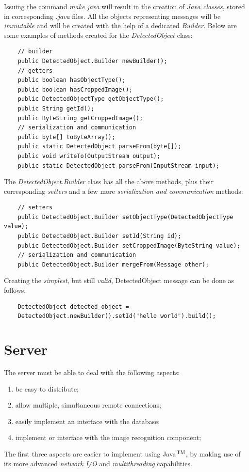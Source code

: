 \documentclass[a4paper,onecolumn,oneside,titlepage,11pt]{report}
\def\tm{\leavevmode\hbox{$\rm {}^{TM}$}}
\begin{document}
Issuing the command \emph{make java} will result in the creation of \emph{Java classes}, stored in corresponding \emph{.java} files.
All the objects representing messages will be \emph{immutable} and will be created with the help of a dedicated \emph{Builder}. Below are some examples of methods created for the \emph{DetectedObject} class:
\begin{lstlisting}
	// builder
	public DetectedObject.Builder newBuilder();
	// getters
	public boolean hasObjectType();
	public boolean hasCroppedImage();
	public DetectedObjectType getObjectType();
	public String getId();
	public ByteString getCroppedImage();
	// serialization and communication
	public byte[] toByteArray();
	public static DetectedObject parseFrom(byte[]);
	public void writeTo(OutputStream output);
	public static DetectedObject parseFrom(InputStream input);
\end{lstlisting}
The \emph{DetectedObject.Builder} class has all the above methods, plus their corresponding \emph{setters} and a few more \emph{serialization and communication} methods:
\begin{lstlisting}
	// setters
	public DetectedObject.Builder setObjectType(DetectedObjectType value);
	public DetectedObject.Builder setId(String id);
	public DetectedObject.Builder setCroppedImage(ByteString value);
	// serialization and communication
	public DetectedObject.Builder mergeFrom(Message other);
	\end{lstlisting}
Creating the \emph{simplest}, but still \emph{valid}, DetectedObject message can be done as follows:
	\begin{lstlisting}
	DetectedObject detected_object =
	DetectedObject.newBuilder().setId("hello world").build();
\end{lstlisting}

\section{Server}
The server must be able to deal with the following aspects:
\begin{enumerate}
	\item be easy to distribute;
	\item allow multiple, simultaneous remote connections;
	\item easily implement an interface with the database;
	\item implement or interface with the image recognition component;
\end{enumerate}
The first three aspects are easier to implement using Java\tm, by making use of its more advanced \emph{network I/O} and \emph{multithreading} capabilities.
\end{document}
